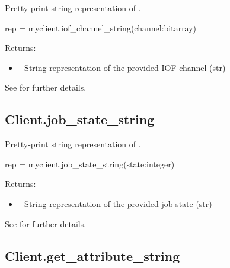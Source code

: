 \summary

Pretty-print string representation of .

\format

\pyspecificstart
\begin{codepar}
rep = myclient.iof_channel_string(channel:bitarray)
\end{codepar}
\pyspecificend

\begin{arglist}
\end{arglist}

Returns:
\begin{itemize}
    \item {} - String representation of the provided IOF channel (str)
\end{itemize}

See  for further details.


\subsection{Client.job_state_string}

\summary

Pretty-print string representation of .

\format

\pyspecificstart
\begin{codepar}
rep = myclient.job_state_string(state:integer)
\end{codepar}
\pyspecificend

\begin{arglist}
\end{arglist}

Returns:
\begin{itemize}
    \item {} - String representation of the provided job state (str)
\end{itemize}

See  for further details.


\subsection{Client.get_attribute_string}

